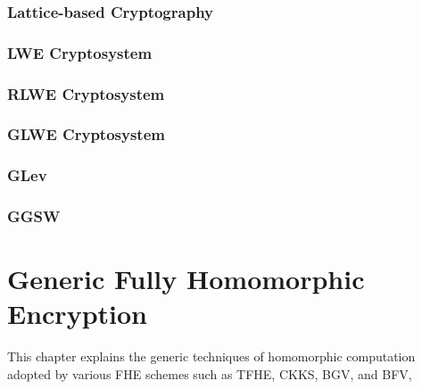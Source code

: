\documentclass[11pt]{article}
\begin{document}
$ $

\clearpage

\section{Lattice-based Cryptography}
\label{sec:lattice}


\clearpage

\section{LWE Cryptosystem}
\label{sec:lwe}


\clearpage

\section{RLWE Cryptosystem}
\label{sec:rlwe}


\clearpage

\section{GLWE Cryptosystem} 
\label{sec:glwe}


\clearpage

\section{GLev}
\label{sec:glev}


\clearpage

\section{GGSW}
\label{sec:ggsw}


\clearpage


\part{Generic Fully Homomorphic Encryption}
\label{part:generic-fhe}

\renewcommand{\thesection}{C-\arabic{section}}
\setcounter{section}{0}

This chapter explains the generic techniques of homomorphic computation adopted by various FHE schemes such as TFHE, CKKS, BGV, and BFV,
\end{document}
